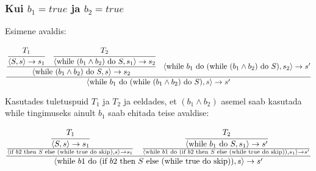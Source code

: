 \subsubsection{Kui \(b_1 = true\) ja \(b_2 = true\)}

Esimene avaldis:

\[
  \frac{
    \cfrac{
      \cfrac{
        T_1
      }{
        \langle
        S, s
        \rangle \rightarrow s_1
      }
      \quad
      \cfrac{
        T_2
      }{
        \langle
        \text{while } (b_1 \wedge b_2) \text{ do } S, s_1
        \rangle \rightarrow s_2
      }
    }{
      \langle
      \text{while } (b_1 \wedge b_2) \text{ do } S, s
      \rangle \rightarrow s_2
    }
    \quad
    \langle
    \text{while } b_1 \text{ do } (\text{while } (b_1 \wedge b_2) \text{ do } S), s_2
    \rangle \rightarrow s'
  }{
    \langle
    \text{while } b_1 \text{ do } (\text{while } (b_1 \wedge b_2) \text{ do } S), s
    \rangle \rightarrow s'
  }
\] 

Kasutades tuletuspuid \(T_1\) ja \(T_2\) ja eeldades, et \((b_1 \wedge b_2)\)
asemel saab kasutada while tingimuseks ainult \(b_1\) saab ehitada teise avaldise:

\[
\frac{
  \frac{
    \cfrac{
      T_1
    }{
      \langle
      S, s
      \rangle \rightarrow s_1
    }
  }{
    \langle
    \text{if } b2 \text{ then } S \text{ else }
    (\text{while true do skip})
    ,s
    \rangle \rightarrow s_1
  }
  \quad
  \frac{
    \cfrac{
      T_2
    }{
      \langle
      \text{while } b_1 \text{ do } S, s_1
      \rangle \rightarrow s'
    }
  }{
    \langle
    \text{while } b1 \text{ do } (\text{if } b2 \text{ then } S \text{ else }
    (\text{while true do skip}))
    ,s_1
    \rangle \rightarrow s'
  }
}{
  \langle
  \text{while } b1 \text{ do } (\text{if } b2 \text{ then } S \text{ else }
  (\text{while true do skip}))
  ,s
  \rangle \rightarrow s'
}
\]
